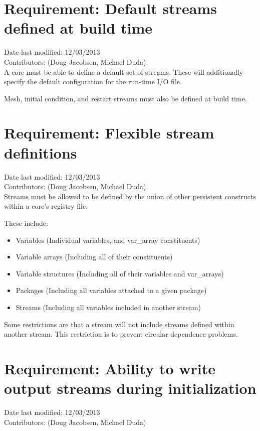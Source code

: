 \documentclass[11pt]{report}
\begin{document}
\section{Requirement: Default streams defined at build time}
Date last modified: 12/03/2013 \\
Contributors: (Doug Jacobsen, Michael Duda) \\

A core must be able to define a default set of streams. These will additionally
specify the default configuration for the run-time I/O file.

Mesh, initial condition, and restart streams must also be defined at build time.

\section{Requirement: Flexible stream definitions}
Date last modified: 12/03/2013 \\
Contributors: (Doug Jacobsen, Michael Duda) \\

Streams must be allowed to be defined by the union of other persistent
constructs within a core's registry file.

These include:
\begin{itemize}
	\item Variables (Individual variables, and var\_array constituents)
	\item Variable arrays (Including all of their constituents)
	\item Variable structures (Including all of their variables and var\_arrays)
	\item Packages (Including all variables attached to a given package)
	\item Streams (Including all variables included in another stream)
\end{itemize}

Some restrictions are that a stream will not include streams defined within
another stream. This restriction is to prevent circular dependence problems.

\section{Requirement: Ability to write output streams during initialization}
Date last modified: 12/03/2013 \\
Contributors: (Doug Jacobsen, Michael Duda) \\
\end{document}
